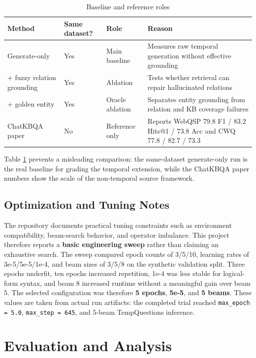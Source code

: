 \documentclass[a4paper,11pt]{article}
\begin{document}
\begin{table}[H]
\centering
\caption{Baseline and reference roles}
\label{tab:baseline-roles}
\begin{tabular}{p{3.6cm}p{2.3cm}p{3.1cm}p{5cm}}
\toprule
\textbf{Method} & \textbf{Same dataset?} & \textbf{Role} & \textbf{Reason} \\
\midrule
Generate-only & Yes & Main baseline & Measures raw temporal generation without effective grounding \\
+ fuzzy relation grounding & Yes & Ablation & Tests whether retrieval can repair hallucinated relations \\
+ golden entity & Yes & Oracle ablation & Separates entity grounding from relation and KB coverage failures \\
ChatKBQA paper & No & Reference only & Reports WebQSP 79.8 F1 / 83.2 Hits@1 / 73.8 Acc and CWQ 77.8 / 82.7 / 73.3 \\
\bottomrule
\end{tabular}
\end{table}

\noindent Table \ref{tab:baseline-roles} prevents a misleading comparison: the same-dataset generate-only run is the real baseline for grading the temporal extension, while the ChatKBQA paper numbers show the scale of the non-temporal source framework.

\subsection{Optimization and Tuning Notes}

The repository documents practical tuning constraints such as environment compatibility, beam-search behavior, and operator imbalance. This project therefore reports a \textbf{basic engineering sweep} rather than claiming an exhaustive search. The sweep compared epoch counts of 3/5/10, learning rates of 3e-5/5e-5/1e-4, and beam sizes of 3/5/8 on the synthetic validation split. Three epochs underfit, ten epochs increased repetition, 1e-4 was less stable for logical-form syntax, and beam 8 increased runtime without a meaningful gain over beam 5. The selected configuration was therefore \textbf{5 epochs}, \textbf{5e-5}, and \textbf{5 beams}. These values are taken from actual run artifacts: the completed trial reached \texttt{max\_epoch = 5.0}, \texttt{max\_step = 645}, and 5-beam TempQuestions inference.

\section{Evaluation and Analysis}
\end{document}
